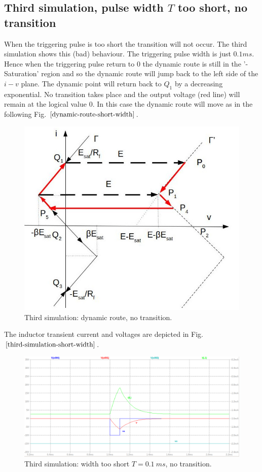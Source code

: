 \documentclass[letterpaper,11pt]{article}
\begin{document}
\subsection{Third simulation, pulse width $T$ too short, no transition}
When the triggering pulse is too short the transition will not occur. The third simulation shows this (bad) behaviour. The triggering pulse width is just $0.1ms$. Hence when the triggering pulse return to $0$ the dynamic route is still in the '- Saturation' region and so the dynamic route will jump back to the left side of the $i-v$ plane. The dynamic point will return back to $Q_1$ by a decreasing exponential. No transition takes place and the output voltage (red line) will remain at the logical value $0$.
In this case the dynamic route will move as in the following Fig. $\ref{dynamic-route-short-width}$.
\begin{figure}[!ht]
        \centering \includegraphics[width=0.6\columnwidth]{driving-point-characteristic-short-width-shifted.jpg}
        \caption{\label{dynamic-route-short-width} Third simulation: dynamic route, no transition.
        }
\end{figure}


\noindent The inductor transient current and voltages are depicted in Fig. $\ref{third-simulation-short-width}$.
%
\begin{figure}[!ht]
        \centering \includegraphics[width=0.8\columnwidth]{width-short-no-transition.png}
        \caption{\label{third-simulation-short-width}Third simulation: width too short $T=0.1\ ms$, no transition.
        }
\end{figure}
%
\clearpage
%
\newpage
%
\end{document}
